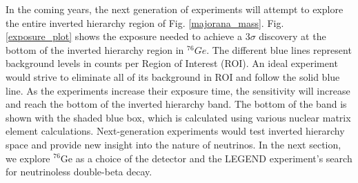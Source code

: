 In the coming years, the next generation of experiments will attempt to explore the entire inverted hierarchy region of Fig. \ref{majorana_mass}. Fig. \ref{exposure_plot} shows the exposure needed to achieve a $3\sigma$ discovery at the bottom of the inverted hierarchy region in ${}^{76}Ge$. The different blue lines represent background levels in counts per Region of Interest (ROI). An ideal experiment would strive to eliminate all of its background in ROI and follow the solid blue line. As the experiments increase their exposure time, the sensitivity will increase and reach the bottom of the inverted hierarchy band. The bottom of the band is shown with the shaded blue box, which is calculated using various nuclear matrix element calculations. Next-generation experiments would test inverted hierarchy space and provide new insight into the nature of neutrinos. In the next section, we explore ${}^{76}\mathrm{Ge}$ as a choice of the detector and the LEGEND experiment's search for neutrinoless double-beta decay.



